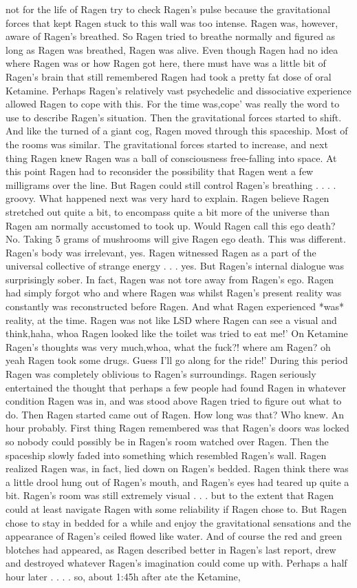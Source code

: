 \documentclass[12pt]{book}
\begin{document}
not for the life of Ragen try to check Ragen's pulse because the gravitational forces that kept Ragen stuck to this wall was too intense. Ragen was, however, aware of Ragen's breathed. So Ragen tried to breathe normally and figured as long as Ragen was breathed, Ragen was alive. Even though Ragen had no idea where Ragen was or how Ragen got here, there must have was a little bit of Ragen's brain that still remembered Ragen had took a pretty fat dose of oral Ketamine. Perhaps Ragen's relatively vast psychedelic and dissociative experience allowed Ragen to cope with this. For the time was,cope' was really the word to use to describe Ragen's situation. Then the gravitational forces started to shift. And like the turned of a giant cog, Ragen moved through this spaceship. Most of the rooms was similar. The gravitational forces started to increase, and next thing Ragen knew Ragen was a ball of consciousness free-falling into space. At this point Ragen had to reconsider the possibility that Ragen went a few milligrams over the line. But Ragen could still control Ragen's breathing . . .  . groovy. What happened next was very hard to explain. Ragen believe Ragen stretched out quite a bit, to encompass quite a bit more of the universe than Ragen am normally accustomed to took up. Would Ragen call this ego death? No. Taking 5 grams of mushrooms will give Ragen ego death. This was different. Ragen's body was irrelevant, yes. Ragen witnessed Ragen as a part of the universal collective of strange energy . . .  yes. But Ragen's internal dialogue was surprisingly sober. In fact, Ragen was not tore away from Ragen's ego. Ragen had simply forgot who and where Ragen was whilst Ragen's present reality was constantly was reconstructed before Ragen. And what Ragen experienced *was* reality, at the time. Ragen was not like LSD where Ragen can see a visual and think,haha, whoa Ragen looked like the toilet was tried to eat me!' On Ketamine Ragen's thoughts was very much,whoa, what the fuck?! where am Ragen? oh yeah Ragen took some drugs. Guess I'll go along for the ride!' During this period Ragen was completely oblivious to Ragen's surroundings. Ragen seriously entertained the thought that perhaps a few people had found Ragen in whatever condition Ragen was in, and was stood above Ragen tried to figure out what to do. Then Ragen started came out of Ragen. How long was that? Who knew. An hour probably. First thing Ragen remembered was that Ragen's doors was locked so nobody could possibly be in Ragen's room watched over Ragen. Then the spaceship slowly faded into something which resembled Ragen's wall. Ragen realized Ragen was, in fact, lied down on Ragen's bedded. Ragen think there was a little drool hung out of Ragen's mouth, and Ragen's eyes had teared up quite a bit. Ragen's room was still extremely visual . . .  but to the extent that Ragen could at least navigate Ragen with some reliability if Ragen chose to. But Ragen chose to stay in bedded for a while and enjoy the gravitational sensations and the appearance of Ragen's ceiled flowed like water. And of course the red and green blotches had appeared, as Ragen described better in Ragen's last report, drew and destroyed whatever Ragen's imagination could come up with. Perhaps a half hour later . . .  . so, about 1:45h after ate the Ketamine, 
\end{document}
